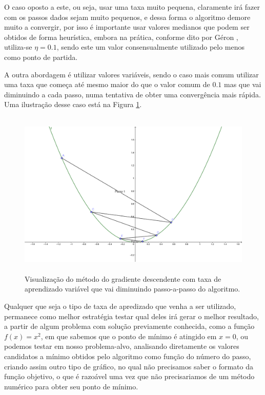 O caso oposto a este, ou seja, usar uma taxa muito pequena, claramente irá fazer com os passos dados sejam muito pequenos, e dessa forma o algoritmo demore muito a convergir, por isso é importante usar valores medianos que podem ser obtidos de forma heurística, embora na prática, conforme dito por Géron \citep{hands}, utiliza-se $\eta = 0.1$, sendo este um valor consensualmente utilizado pelo menos como ponto de partida.

A outra abordagem é utilizar valores variáveis, sendo o caso mais comum utilizar uma taxa que começa até mesmo maior do que o valor comum de $0.1$ mas que vai diminuindo a cada passo, numa tentativa de obter uma convergência mais rápida. Uma ilustração desse caso está na Figura \ref{fig:grad_3}.

\begin{figure}[htb]
\centering
\includegraphics[height=8cm]{figuras/grad_3}
\caption{Visualização do método do gradiente descendente com taxa de aprendizado variável que vai diminuindo passo-a-passo do algoritmo.}
\label{fig:grad_3}
\end{figure}

Qualquer que seja o tipo de taxa de apredizado que venha a ser utilizado, permanece como melhor estratégia testar qual deles irá gerar o melhor resultado, a partir de algum problema com solução previamente conhecida, como a função $f(x) = x^2$, em que sabemos que o ponto de mínimo é atingido em $x = 0$, ou podemos testar em nosso problema-alvo, analisando diretamente os valores candidatos a mínimo obtidos pelo algoritmo como função do número do passo, criando assim outro tipo de gráfico, no qual não precisamos saber o formato da função objetivo, o que é razoável uma vez que não precisariamos de um método numérico para obter seu ponto de mínimo.

